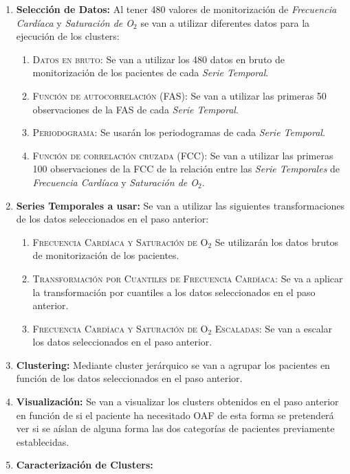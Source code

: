 \begin{enumerate}
    \item \textbf{Selección de Datos:} Al tener 480 valores de monitorización de \textit{Frecuencia Cardíaca} y \textit{Saturación de O$_2$} se van a utilizar diferentes datos para la ejecución de los clusters:
    \begin{enumerate}
        \item \textsc{Datos en bruto:} Se van a utilizar los 480 datos en bruto de monitorización de los pacientes de cada \textit{Serie Temporal}.
        \item \textsc{Función de autocorrelación (FAS):} Se van a utilizar las primeras 50 observaciones de la FAS de cada \textit{Serie Temporal}.
        \item \textsc{Periodograma:} Se usarán los periodogramas de cada \textit{Serie Temporal}.
        \item \textsc{Función de correlación cruzada (FCC):} Se van a utilizar las primeras 100 observaciones de la FCC de la relación entre las \textit{Serie Temporales} de \textit{Frecuencia Cardíaca} y \textit{Saturación de O$_2$}.
    \end{enumerate}
    \item \textbf{Series Temporales a usar:} Se van a utilizar las siguientes transformaciones de los datos seleccionados en el paso anterior:
    \begin{enumerate}
        \item \textsc{Frecuencia Cardíaca y Saturación de O$_2$} Se utilizarán los datos brutos de monitorización de los pacientes.
        \item \textsc{Transformación por Cuantiles de Frecuencia Cardíaca:} Se va a aplicar la transformación por cuantiles a los datos seleccionados en el paso anterior.
        \item \textsc{Frecuencia Cardíaca y Saturación de O$_2$ Escaladas:} Se van a escalar los datos seleccionados en el paso anterior.
    \end{enumerate}
    \item \textbf{Clustering:} Mediante cluster jerárquico se van a agrupar los pacientes en función de los datos seleccionados en el paso anterior.
    \item \textbf{Visualización:} Se van a visualizar los clusters obtenidos en el paso anterior en función de si el paciente ha necesitado OAF de esta forma se pretenderá ver si se aíslan de alguna forma las dos categorías de pacientes previamente establecidas. 
    \item \textbf{Caracterización de Clusters:} 

\end{enumerate}
